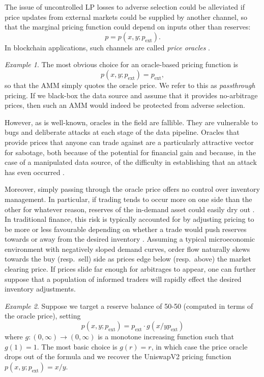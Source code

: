 \documentclass[a4paper,10pt]{article}
\theoremstyle{remark}
\newtheorem*{example}{Example}
\begin{document}
The issue of uncontrolled LP losses to adverse selection could be alleviated if price updates from external markets could be supplied by another channel, so that the marginal pricing function could depend on inputs other than reserves:
\[
  p = p(x,y;p_\mathrm{ext}).
\]
%
In blockchain applications, such channels are called \emph{price oracles} \cite{heiss2019oracles, muhlberger2020foundational, albreiki2020trustworthy}.

\begin{example} The most obvious choice for an oracle-based pricing function is
\[
  p(x,y;p_\mathrm{ext}) = p_\mathrm{ext},
\]
so that the AMM simply quotes the oracle price.
%
We refer to this as \emph{passthrough} pricing.
%
If we black-box the data source and assume that it provides no-arbitrage prices, then such an AMM would indeed be protected from adverse selection. \end{example}

However, as is well-known, oracles in the field are fallible.
%
They are vulnerable to bugs and deliberate attacks at each stage of the data pipeline.
%
Oracles that provide prices that anyone can trade against are a particularly attractive vector for sabotage, both because of the potential for financial gain and because, in the case of a manipulated data source, of the difficulty in establishing that an attack has even occurred \cite{samczsun2020so, suresh2022so}.

Moreover, simply passing through the oracle price offers no control over inventory management.
%
In particular, if trading tends to occur more on one side than the other for whatever reason, reserves of the in-demand asset could easily dry out \cite[\S2.2]{garman1976market}.
%
In traditional finance, this risk is typically accounted for by adjusting pricing to be more or less favourable depending on whether a trade would push reserves towards or away from the desired inventory \cite{biais2005market}.
%
Assuming a typical microeconomic environment with negatively sloped demand curves, order flow naturally skews towards the buy (resp.~sell) side as prices edge below (resp.~above) the market clearing price.
%
If prices slide far enough for arbitrages to appear, one can further suppose that a population of informed traders will rapidly effect the desired inventory adjustments.

\begin{example}
  Suppose we target a reserve balance of 50-50 (computed in terms of the oracle price), setting
  \[
    p(x,y;p_\mathrm{ext}) = p_\mathrm{ext}\cdot g\left(x/yp_\mathrm{ext}\right)
  \]
  where $g:(0,\infty)\rightarrow(0,\infty)$ is a monotone increasing function such that $g(1) = 1$.
  The most basic choice is $g(r)=r$, in which case the price oracle drops out of the formula and we recover the UniswapV2 pricing function $p(x,y;p_\mathrm{ext})=x/y$.
\end{example}
\end{document}

